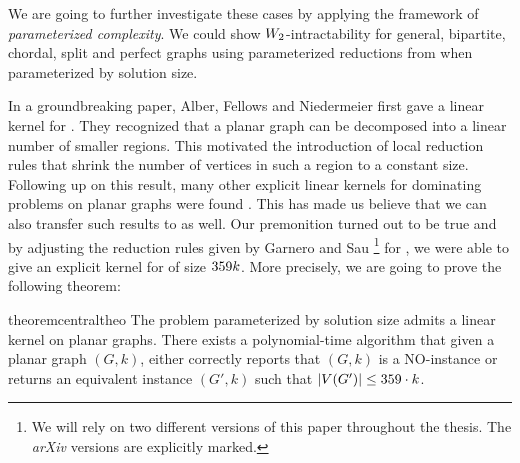 We are going to further investigate these \NPc cases by applying the framework of \textit{parameterized complexity}. 
We could show $W_2$-intractability for general, bipartite, chordal, split and perfect graphs using parameterized reductions from \dom when parameterized by solution size.

In a groundbreaking paper, Alber, Fellows and Niedermeier \cite{Alber2004} first gave a linear kernel for \pdom. 
They recognized that a planar graph can be decomposed into a linear number of smaller regions. 
This motivated the introduction of local reduction rules that shrink the number of vertices in such a region to a constant size. 
Following up on this result, many other explicit linear kernels for dominating problems on planar graphs were found \cite{Guo2007, Garnero2017, Luo2013, Alber2006}. 
This has made us believe that we can also transfer such results to \psdom as well.
Our premonition turned out to be true and by adjusting the reduction rules given by Garnero and Sau \cite{Garnero2018}\footnote{We will rely on two different versions of this paper throughout the thesis. The \textit{arXiv} versions are explicitly marked.} for \ptdom, we were able to give an explicit kernel for \psdom of size $359 k$. 
More precisely, we are going to prove the following theorem:

\begin{restatable}[]{theorem}{centraltheo}\label{thm:central}
    The \sdom problem parameterized by solution size admits a linear kernel on planar graphs. There exists a polynomial-time algorithm that given a planar graph $(G, k)$, either correctly reports that $(G, k)$ is a NO-instance or returns an equivalent instance $(G', k)$ such that $\abs{V(G')} \leq 359 \cdot k$.
\end{restatable}